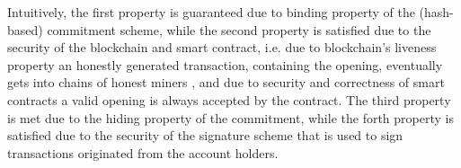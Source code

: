 %
%
%  
 
 
 Intuitively, the first property is guaranteed due to binding property of the (hash-based) commitment scheme, while the second property is satisfied due to the security of the blockchain and smart contract, i.e. due to blockchain's liveness property an honestly generated transaction, containing the opening,  eventually gets into  chains of honest miners \cite{GarayKL15}, and due to   security and correctness of smart contracts a valid opening is always accepted by the contract. The third property is met due to the hiding property of the commitment, while  the forth property is satisfied due to the security of the signature scheme that is used to sign  transactions originated from the account holders. 
 
